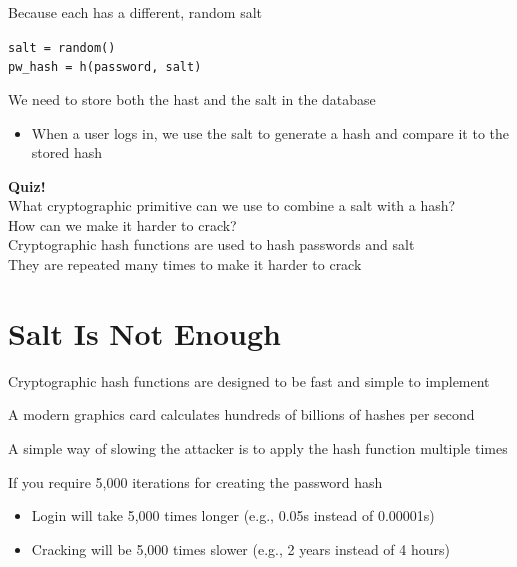 \documentclass[11pt]{article}
\begin{document}
Because each has a different, random salt
\begin{center}
	\verb|salt = random()| \\
	\verb|pw_hash = h(password, salt)|
\end{center}

We need to store both the hast and the salt in the database
\begin{itemize}
	\item When a user logs in, we use the salt to generate a hash and compare it to the stored hash
\end{itemize}

\begin{tcolorbox}[
  colback=gray!15,     %
  colframe=black!50,    %
  boxrule=1pt,       %
  arc=3mm,             %
  left=4mm, right=4mm, top=2mm, bottom=2mm %
]
\textbf{Quiz!} \\
What cryptographic primitive can we use to combine a salt with a hash? \\
How can we make it harder to crack? \\

\vspace{0.5cm}
Cryptographic hash functions are used to hash passwords and salt \\

They are repeated many times to make it harder to crack
\end{tcolorbox}

\section*{Salt Is Not Enough}

Cryptographic hash functions are designed to be fast and simple to implement

A modern graphics card calculates hundreds of billions of hashes per second

A simple way of slowing the attacker is to apply the hash function multiple times

If you require 5,000 iterations for creating the password hash
\begin{itemize}
	\item Login will take 5,000 times longer (e.g., 0.05s instead of 0.00001s)
	\item Cracking will be 5,000 times slower (e.g., 2 years instead of 4 hours)
\end{itemize}
\end{document}
